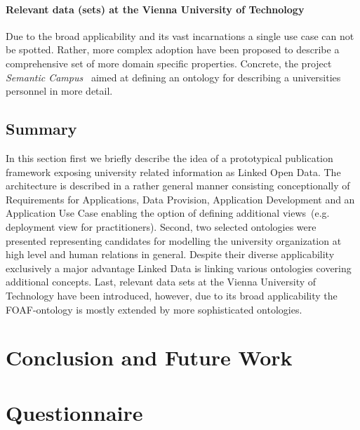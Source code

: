\documentclass{article}
\begin{document}
\paragraph{Relevant data (sets) at the Vienna University of Technology}
Due to the broad applicability and its vast incarnations a single use case can not be spotted. Rather, more complex adoption have been proposed to describe a comprehensive set of more domain specific properties. Concrete, the project \textit{Semantic Campus}~\cite{inproceedings:semantic-campus} aimed at defining an ontology for describing a universities personnel in more detail. 
\subsection{Summary}
In this section first we briefly describe the idea of a prototypical publication framework exposing university related information as Linked Open Data. The architecture is described in a rather general manner consisting conceptionally of Requirements for Applications, Data Provision, Application Development and an Application Use Case enabling the option of defining additional views~(e.g. deployment view for practitioners). Second, two selected ontologies were presented representing candidates for modelling the university organization at high level and human relations in general. Despite their diverse applicability exclusively a major advantage Linked Data is linking various ontologies covering additional concepts. 
Last, relevant data sets at the Vienna University of Technology have been introduced, however, due to its broad applicability the FOAF-ontology is mostly extended by more sophisticated ontologies. 
\section{Conclusion and Future Work}

\newpage



\newpage
\appendix
\section{Questionnaire}

\end{document}
